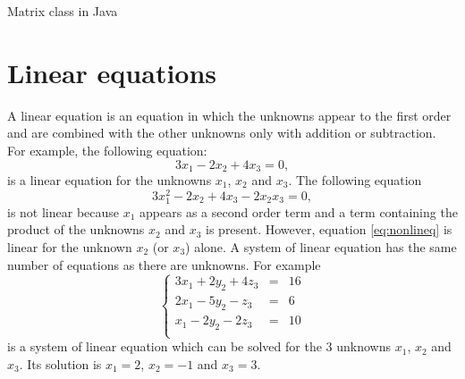 \documentclass[twoside]{book}
\begin{document}
\begin{listing} Matrix class in Java \label{lj:matrix}

\end{listing}

\section{Linear equations}
\label{sec:lineqs} A linear equation is an equation in which the
unknowns appear to the first order and are combined with the other
unknowns only with addition or subtraction. For example, the
following equation:
\begin{equation}
  3x_1-2x_2+4x_3=0,
\end{equation}
is a linear equation for the unknowns $x_1$, $x_2$ and $x_3$. The
following equation
\begin{equation}
\label{eq:nonlineq}
  3x_1^2-2x_2+4x_3 - 2 x_2 x_3=0,
\end{equation}
is not linear because $x_1$ appears as a second order term and a
term containing the product of the unknowns $x_2$ and $x_3$ is
present. However, equation \ref{eq:nonlineq} is linear for the
unknown $x_2$ (or $x_3$) alone. A system of linear equation has
the same number of equations as there are unknowns. For example
\begin{equation}
\label{eq:lineqex}
  \left\{
  \begin{array}{lcr}
  3x_1+2y_2+4z_3&=&16\\
  2x_1-5y_2-z_3&=&6\\
  x_1-2y_2-2z_3&=&10\\
\end{array}\right.
\end{equation}
is a system of linear equation which can be solved for the 3
unknowns $x_1$, $x_2$ and $x_3$. Its solution is $x_1=2$, $x_2=-1$
and $x_3=3$.
\end{document}
